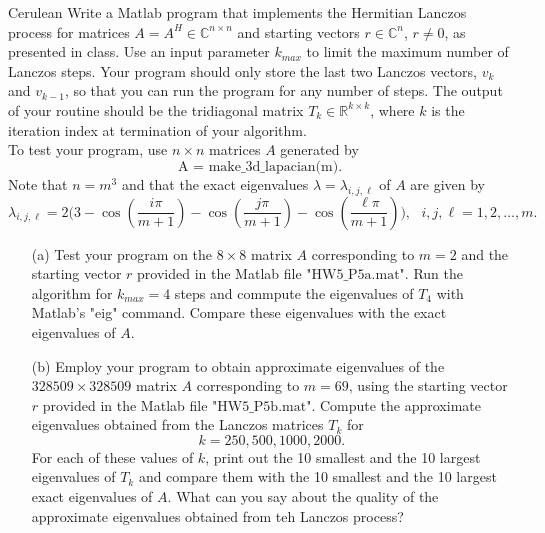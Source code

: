\documentclass[12pt]{article}
\def\C{\mathbb{C}}
\def\R{\mathbb{R}}
\begin{document}
\begin{mybox}{Cerulean}{}
Write a Matlab program that implements the Hermitian Lanczos process for matrices $A = A^H \in\C^{n\times n}$ and starting vectors $r \in\C^n$, $r \neq 0$, as presented in class.  Use an input parameter $k_{max}$ to limit the maximum number of Lanczos steps.  Your program should only store the last two Lanczos vectors, $v_k$ and $v_{k-1}$, so that you can run the program for any number of steps.  The output of your routine should be the tridiagonal matrix $T_k \in \R^{k\times k}$, where $k$ is the iteration index at termination of your algorithm.\\
To test your program, use $n\times n$ matrices $A$ generated by
$$\text{A = make\_3d\_lapacian(m)}.$$
Note that $n=m^3$ and that the exact eigenvalues $\lambda = \lambda_{i,j,\ell}$ of $A$ are given by
$$\lambda_{i,j,\ell} = 2\bigg(3 - \cos\left(\frac{i\pi}{m+1}\right) - \cos\left(\frac{j\pi}{m+1}\right) - \cos\left(\frac{\ell\pi}{m+1}\right)\bigg), \text{ } i,j,\ell = 1,2,\dots,m.$$

\begin{itemize}

\item[(a)] Test your program on the $8\times 8$ matrix $A$ corresponding to $m=2$ and the starting vector $r$ provided in the Matlab file $\text{"HW5\_P5a.mat"}$.  Run the algorithm for $k_{max} = 4$ steps and commpute the eigenvalues of $T_4$ with Matlab's "eig" command.  Compare these eigenvalues with the exact eigenvalues of $A$.\\
\item[(b)] Employ your program to obtain approximate eigenvalues of the $328509\times 328509$ matrix $A$ corresponding to $m=69$, using the starting vector $r$ provided in the Matlab file $\text{"HW5\_P5b.mat"}$.  Compute the approximate eigenvalues obtained from the Lanczos matrices $T_k$ for
$$k = 250, 500, 1000, 2000.$$
For each of these values of $k$, print out the 10 smallest and the 10 largest eigenvalues of $T_k$ and compare them with the 10 smallest and the 10 largest exact eigenvalues of $A$.  What can you say about the quality of the approximate eigenvalues obtained from teh Lanczos process?\\
\end{itemize}
\end{mybox}
\end{document}
